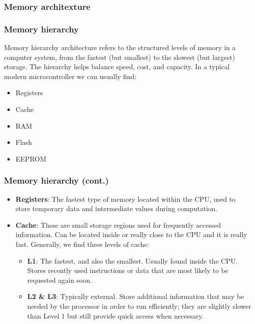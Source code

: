 \documentclass[aspectratio=169]{beamer}
\begin{document}
\subsubsection{Memory architexture}
\begin{frame}
  \frametitle{Memory hierarchy}
  Memory hierarchy architecture refers to the structured levels of memory in a computer system, from the fastest (but smallest) to the slowest (but largest) storage. The hierarchy helps balance speed, cost, and capacity. In a typical modern microcontroller we can usually find:
  \begin{itemize}
    \item <2-> Registers
    \item <3-> Cache 
    \item <4-> RAM 
    \item <5-> Flash 
    \item <6-> EEPROM 
  \end{itemize}
\end{frame}

\begin{frame}
  \frametitle{Memory hierarchy (cont.)}
  \begin{itemize}
    \item <1-> \textbf{Registers}: The fastest type of memory located within the CPU, used to store temporary data and intermediate values during computation.
    \item <2-> \textbf{Cache}: These are small storage regions used for frequently accessed information. Can be located inside or really close to the CPU and it is really fast. Generally, we find three levels of cache:
    \begin{itemize}
      \item <3-> \textbf{L1}: The fastest, and also the smallest. Usually found inside the CPU. Stores recently used instructions or data that are most likely to be requested again soon.
      \item <3-> \textbf{L2 \& L3}: Typically external. Store additional information that may be needed by the processor in order to run efficiently; they are slightly slower than Level 1 but still provide quick access when necessary.
    \end{itemize}
  \end{itemize}
\end{frame}
\end{document}
